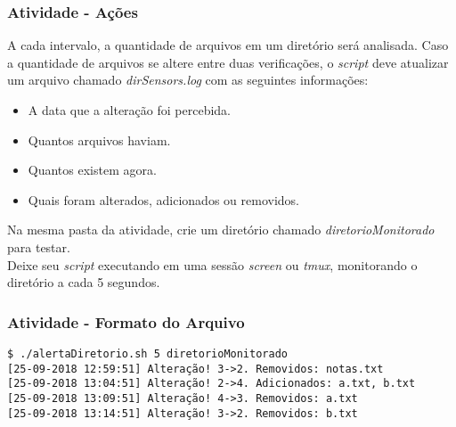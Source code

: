 \documentclass{beamer}
\begin{document}
   \begin{frame}
      \frametitle{Atividade - Ações}
      A cada intervalo, a quantidade de arquivos em um diretório será analisada. Caso a quantidade de arquivos se altere entre duas verificações, o \textit{script} deve atualizar um arquivo chamado \textit{dirSensors.log} com as seguintes informações:
      \begin{itemize}
         \item A data que a alteração foi percebida.
	 \item Quantos arquivos haviam.
         \item Quantos existem agora.
         \item Quais foram alterados, adicionados ou removidos.
      \end{itemize}
      Na mesma pasta da atividade, crie um diretório chamado \textit{diretorioMonitorado} para testar. \\
      Deixe seu \textit{script} executando em uma sessão \textit{screen} ou \textit{tmux}, monitorando o diretório a cada 5 segundos. \\
   \end{frame}

   \begin{frame}[fragile]
      \frametitle{Atividade - Formato do Arquivo}	     
      \footnotesize
      \begin{verbatim}
$ ./alertaDiretorio.sh 5 diretorioMonitorado
[25-09-2018 12:59:51] Alteração! 3->2. Removidos: notas.txt
[25-09-2018 13:04:51] Alteração! 2->4. Adicionados: a.txt, b.txt
[25-09-2018 13:09:51] Alteração! 4->3. Removidos: a.txt
[25-09-2018 13:14:51] Alteração! 3->2. Removidos: b.txt
      \end{verbatim}
\end{frame}
\end{document}

